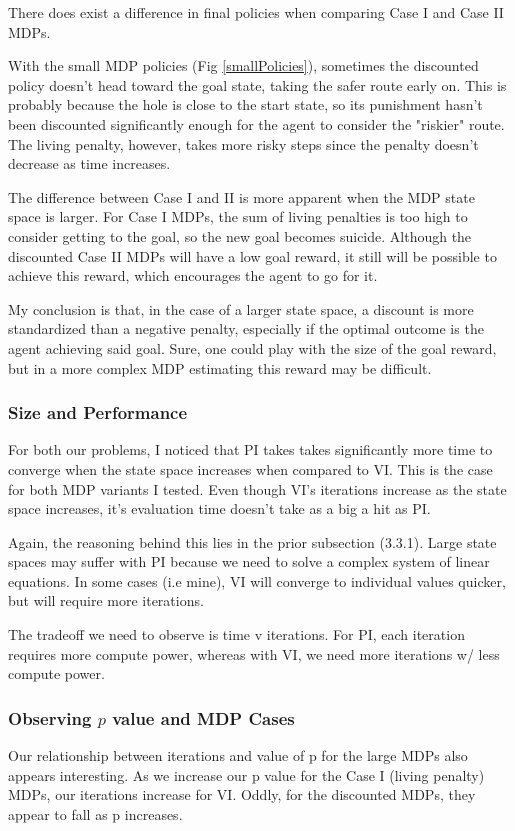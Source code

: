 \documentclass[letter]{article}
\begin{document}
There does exist a difference in final policies when comparing Case I and Case II MDPs. 

With the small MDP policies (Fig \ref{smallPolicies}), sometimes the discounted policy doesn't head toward the goal state, taking the safer route early on. This is probably because the hole is close to the start state, so its punishment hasn't been discounted significantly enough for the agent to consider the "riskier" route. The living penalty, however, takes more risky steps since the penalty doesn't decrease as time increases.

The difference between Case I and II is more apparent when the MDP state space is larger. For Case I MDPs, the sum of living penalties is too high to consider getting to the goal, so the new goal becomes suicide. Although the discounted Case II MDPs will have a low goal reward, it still will be possible to achieve this reward, which encourages the agent to go for it.

My conclusion is that, in the case of a larger state space, a discount is more standardized than a negative penalty, especially if the optimal outcome is the agent achieving said goal. Sure, one could play with the size of the goal reward, but in a more complex MDP estimating this reward may be difficult.

\subsubsection{Size and Performance}
For both our problems, I noticed that PI takes takes significantly more time to converge when the state space increases when compared to VI. This is the case for both MDP variants I tested. Even though VI's iterations increase as the state space increases, it's evaluation time doesn't take as a big a hit as PI. 

Again, the reasoning behind this lies in the prior subsection (3.3.1). Large state spaces may suffer with PI because we need to solve a complex system of linear equations. In some cases (i.e mine), VI will converge to individual values quicker, but will require more iterations.

The tradeoff we need to observe is time v iterations. For PI, each iteration requires more compute power, whereas with VI, we need more iterations w/ less compute power.

\subsubsection{Observing $p$ value and MDP Cases}
Our relationship between iterations and value of p for the large MDPs also appears interesting. As we increase our p value for the Case I (living penalty) MDPs, our iterations increase for VI. Oddly, for the discounted MDPs, they appear to fall as p increases. 
\end{document}
